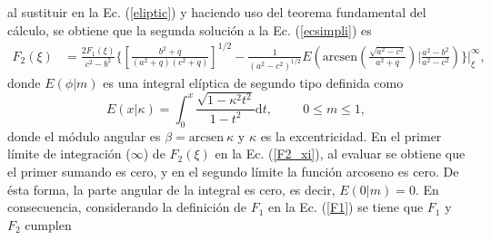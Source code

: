 al sustituir en la Ec. (\ref{eliptic}) y haciendo uso del teorema fundamental del cálculo, se obtiene que la segunda solución a la Ec. (\ref{ecsimpli}) es 
\begin{align}
    F_2(\xi)&=\frac{2F_1(\xi)}{c^2-b^2}\Bigg\{\left[\frac{b^2+q}{(a^2+q)(c^2+q)}\right]^{1/2}-\frac{1}{(a^2-c^2)^{1/2}}E\left(\mbox{arcsen}\left(\frac{\sqrt{a^2-c^2}}{a^2+q}\right)\Bigg|\frac{a^2-b^2}{a^2-c^2}\right)\Bigg\}\Bigg|_\xi^{\infty},
    \label{F2_xi}
\end{align}
donde $E(\phi|m)$ es una integral elíptica de segundo tipo definida como  \cite{Abramowitz}
\begin{equation}
    E(x|\kappa)=\int_{0}^x\frac{\sqrt{1-\kappa^2t^2}}{1-t^2}\text{d}t,\hspace{1cm}0\leq m\leq 1,
\end{equation}
donde el módulo angular es $\beta=\mbox{arcsen}\:\kappa$ y $\kappa$ es la excentricidad. En el primer límite de integración ($\infty$) de $F_2(\xi)$ en la Ec. (\ref{F2_xi}), al evaluar se obtiene que el primer sumando es cero, y en el segundo límite la función arcoseno es cero. De ésta forma, la parte angular de la integral es cero, es decir, $E(0|m)=0$. En consecuencia, considerando la definición de $F_1$ en la Ec. (\ref{F1}) se tiene que $F_1$ y $F_2$ cumplen

